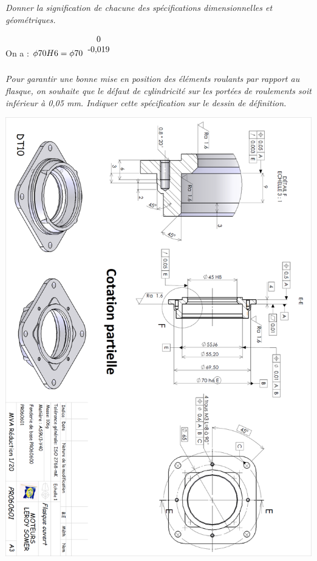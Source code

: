 \documentclass[10pt,fleqn]{article} %
\begin{document}
\begin{multicols}{2}
\subparagraph{}\textit{Donner la signification de chacune des spécifications dimensionnelles et géométriques.}

\begin{rem}
On a : $\phi 70 H6 = \phi 70 ^{\begin{tabular}{c}0 \\ -0,019\end{tabular}}$
\end{rem}
\subparagraph{}\textit{Pour garantir une bonne mise en position des éléments roulants par rapport au flasque, on souhaite que le défaut de cylindricité sur les portées de roulements soit inférieur à 0,05 mm. Indiquer cette spécification sur le dessin de définition.}
\end{multicols}

\begin{center}
\includegraphics[width=\textwidth]{images/reducteur_03}
\end{center}
\end{document}
